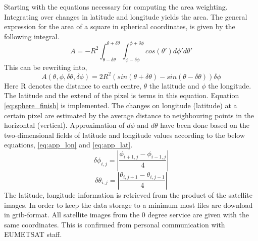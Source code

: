 Starting with the equations necessary for computing the area weighting. Integrating over changes in latitude and longitude yields the area. The general expression for the area of a square in spherical coordinates, is given by the following integral. 
\begin{equation} \label{eq:sphere_integral}
    A = -R^2\int_{ \theta - \delta \theta }^{\theta + \delta \theta} \int_{ \phi - \delta \phi }^{\phi + \delta \phi} cos\left( \theta' \right) d\phi' d\theta'
\end{equation}
This can be rewriting into,
\begin{equation} \label{eq:sphere_finish}
    A \left( \theta, \phi, \delta \theta, \delta \phi   \right)= 2R^2 \left( sin\left( \theta + \delta \theta  \right) - sin\left(  \theta - \delta \theta  \right) \right) \delta \phi
\end{equation}
Here R denotes the distance to earth centre, $\theta$ the latitude and $\phi$ the longitude. The latitude and the extend of the pixel is terms in this equation. Equation \ref{eq:sphere_finish} is implemented. The changes on longitude (latitude) at a certain pixel are estimated by the average distance to neighbouring points in the horizontal (vertical). Approximation of $d\phi$ and $d\theta$ have been done based on the two-dimensional fields of latitude and longitude values according to the below equations, \eqref{eq:app_lon} and  \eqref{eq:app_lat}.
\begin{equation} \label{eq:app_lon}
    \delta \phi_{i,j} = \left| \frac{\phi_{i+1,j} - \phi_{i-1, j}}{4} \right|
\end{equation}
\begin{equation} \label{eq:app_lat}
    \delta \theta_{i,j} = \left| \frac{\theta_{i,j+1} - \theta_{i, j-1}}{4} \right|
\end{equation}
The latitude, longitude information is retrieved from the product of the satellite images. In order to keep the data storage to a minimum most files are download in grib-format. All satellite images from the 0 degree service are given with the same coordinates. This is confirmed from personal communication with EUMETSAT staff.

